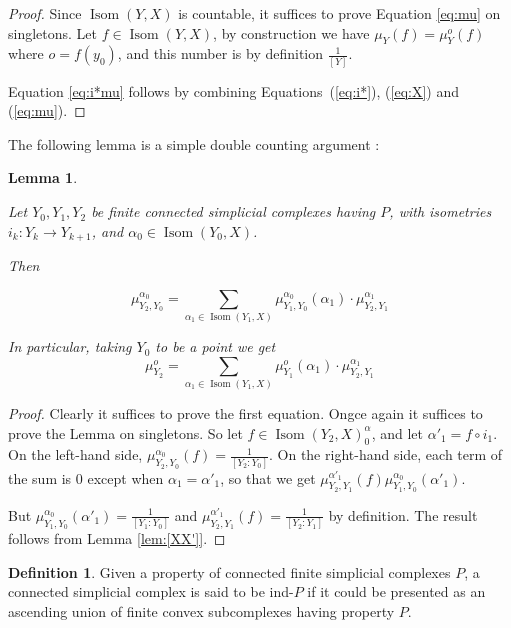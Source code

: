 \documentclass[a4paper, 11pt]{article}
\theoremstyle{plain}
\newtheorem{lemma}[proposition]{Lemma}
\theoremstyle{definition}
\newtheorem{definition}[proposition]{Definition}
\theoremstyle{remark}
\DeclareMathOperator{\Isom}{Isom}
\begin{document}
\begin{proof}
Since $\Isom(Y,X)$ is countable, it suffices to prove Equation \eqref{eq:mu} on singletons. Let $f\in \Isom(Y,X)$, by construction we have $\mu_Y(f)= \mu_Y^o (f)$ where $o=f(y_0)$, and this number is by definition $\frac{1}{[Y]}$. 

Equation \eqref{eq:i*mu} follows 
by combining Equations~(\ref{eq:i*}), (\ref{eq:X}) and (\ref{eq:mu}).
\end{proof}


The following lemma is a simple double counting argument :


\begin{lemma}\label{lem:finiterestricted}

Let $Y_0,Y_1,Y_2$ be finite connected simplicial complexes having $P$, with isometries $i_k:Y_k\to Y_{k+1}$, and $\alpha_0\in\Isom(Y_0,X)$.

Then

$$\mu_{Y_2,Y_0}^{\alpha_0} = \sum_{\alpha_1\in \Isom(Y_1,X)} \mu_{Y_1,Y_0}^{\alpha_0} (\alpha_1) \cdot \mu_{Y_2,Y_1}^{\alpha_1} $$


In particular, taking $Y_0$ to be a point we get 
$$\mu_{Y_2}^{o} = \sum_{\alpha_1\in \Isom(Y_1,X)} \mu_{Y_1}^{o} (\alpha_1)\cdot \mu_{Y_2,Y_1}^{\alpha_1} $$

\end{lemma}

\begin{proof}
Clearly it suffices to prove the first equation.
Ongce again it suffices to prove the Lemma on singletons. So let $f\in \Isom(Y_2,X)^\alpha_0$, and let $\alpha'_1 = f\circ i_1$. On the left-hand side, $\mu_{Y_2,Y_0}^{\alpha_0} (f) = \frac{1}{[Y_2:Y_0]}$. On the right-hand side, each term of the sum is $0$ except when $\alpha_1=\alpha'_1$, so that we get $\mu_{Y_2,Y_1}^{\alpha'_1}(f) \mu_{Y_1,Y_0}^{\alpha_0}(\alpha'_1)$. 

But $\mu_{Y_1,Y_0}^{\alpha_0}(\alpha'_1) = \frac{1}{[Y_1:Y_0]}$ and $\mu_{Y_2,Y_1}^{\alpha'_1}(f) = \frac{1}{[Y_2:Y_1]}$ by definition. The result follows from Lemma \ref{lem:[XX']}.
\end{proof}


\begin{definition}
Given a property of connected finite simplicial complexes $P$,
a connected simplicial complex is said to be ind-$P$ if it could be presented as an ascending union of finite convex subcomplexes having property $P$.
\end{definition}
\end{document}

